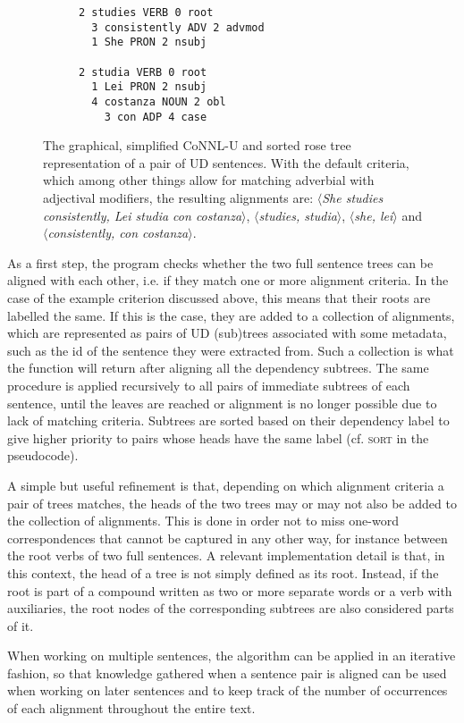 \documentclass[11pt]{article}
\begin{document}
\begin{figure*}[h]
\begin{subfigure}{.32 \textwidth}
\begin{verbatim}
2 studies VERB 0 root  
  3 consistently ADV 2 advmod
  1 She PRON 2 nsubj
      
2 studia VERB 0 root
  1 Lei PRON 2 nsubj
  4 costanza NOUN 2 obl
    3 con ADP 4 case
    \end{verbatim}
  \end{subfigure}
  \caption{The graphical, simplified CoNNL-U and sorted rose tree representation of a pair of UD sentences. With the default criteria, which among other things allow for matching adverbial with adjectival modifiers, the resulting alignments are: $\langle$\textit{She studies consistently, Lei studia con costanza}$\rangle$, $\langle$\textit{studies, studia}$\rangle$, $\langle$\textit{she, lei}$\rangle$ and $\langle$\textit{consistently, con costanza}$\rangle$.}
  \label{ex}
\end{figure*}

As a first step, the program checks whether the two full sentence trees can be aligned with each other, i.e. if they match one or more alignment criteria. 
In the case of the example criterion discussed above, this means that their roots are labelled the same.
If this is the case, they are added to a collection of alignments, which are represented as pairs of UD (sub)trees associated with some metadata, such as the id of the sentence they were extracted from.
Such a collection is what the function will return after aligning all the dependency subtrees.
The same procedure is applied recursively to all pairs of immediate subtrees of each sentence, until the leaves are reached or alignment is no longer possible due to lack of matching criteria.
Subtrees are sorted based on their dependency label to give higher priority to pairs whose heads have the same label (cf. \textsc{sort} in the pseudocode).

A simple but useful refinement is that, depending on which alignment criteria a pair of trees matches, the heads of the two trees may or may not also be added to the collection of alignments. 
This is done in order not to miss one-word correspondences that cannot be captured in any other way, for instance between the root verbs of two full sentences.
A relevant implementation detail is that, in this context, the head of a tree is not simply defined as its root. Instead, if the root is part of a compound written as two or more separate words or a verb with auxiliaries, the root nodes of the corresponding subtrees are also considered parts of it.

When working on multiple sentences, the algorithm can be applied in an iterative fashion, so that knowledge gathered when a sentence pair is aligned can be used when working on later sentences and to keep track of the number of occurrences of each alignment throughout the entire text.
\end{document}
